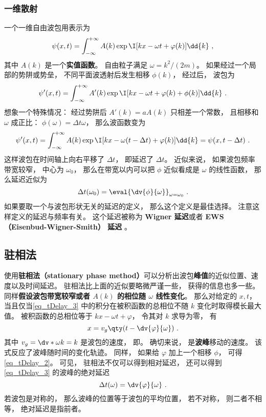 \subsubsection{一维散射}
一个一维自由波包用表示为
\begin{equation}\label{eq_tDelay_3}
\psi(x, t) = \int_{-\infty}^{+\infty} A(k) \exp \I[kx - \omega t + \varphi(k)] \dd{k}~,
\end{equation}
其中 $A(k)$ 是一个\textbf{实值函数}。 自由粒子满足 $\omega = k^2/(2m)$。 如果经过一个局部的势阱或势垒， 不同平面波透射后发生相移 $\phi(k)$， 经过后， 波包为
\begin{equation}\label{eq_tDelay_1}
\psi'(x, t) = \int_{-\infty}^{+\infty} A'(k) \exp \I[kx - \omega t + \varphi(k) + \phi(k)] \dd{k}~.
\end{equation}
想象一个特殊情况： 经过势阱后 $A'(k) = a A(k)$ 只相差一个常数， 且相移和 $\omega$ 成正比： $\phi(\omega) = \Delta t \omega$， 那么波函数变为
\begin{equation}
\psi'(x, t) = \int_{-\infty}^{+\infty} A(k) \exp \I[kx - \omega (t - \Delta t) + \varphi(k)] \dd{k}
= \psi(x, t - \Delta t)~.
\end{equation}
这样波包在时间轴上向右平移了 $\Delta t$， 即延迟了 $\Delta t$。 近似来说， 如果波包频率带宽较窄， 中心为 $\omega_0$， 那么在带宽以内可以把 $\phi$ 近似看成是 $\omega$ 的线性函数， 那么延迟近似为
\begin{equation}\label{eq_tDelay_2}
\Delta t(\omega_0) = \eval{\dv{\phi}{\omega}}_{\omega = \omega_0}~.
\end{equation}
如果要取一个与波包形状无关的延迟的定义， 那么这个定义是最佳选择。 注意这样定义的延迟与频率有关。 这个延迟被称为 \textbf{Wigner 延迟}或者 \textbf{EWS （Eisenbud-Wigner-Smith） 延迟} 。

\subsection{驻相法}
使用\textbf{驻相法（stationary phase method）}可以分析出波包\textbf{峰值}的近似位置、速度以及时间延迟。 驻相法比上面的近似要略微严谨一些， 获得的信息也多一些。 同样\textbf{假设波包带宽较窄或者 $A(k)$ 的相位随 $\omega$ 线性变化}。 那么对给定的 $x, t$， 当且仅当\autoref{eq_tDelay_3} 中的积分在被积函数的总相位不随 $k$ 变化时取得模长最大值。 被积函数的总相位等于 $kx - \omega t + \varphi$， 令其对 $k$ 求导为零， 有
\begin{equation}\label{eq_tDelay_5}
x = v_g \qty(t - \dv{\varphi}{\omega})~.
\end{equation}
其中 $v_g = \dv*{\omega}{k} = k$ 是波包的速度， 即。 确切来说， 是\textbf{波峰}移动的速度。 该式反应了波峰随时间的变化轨迹。 同样， 如果给 $\varphi$ 加上一个相移 $\phi$， 可得\autoref{eq_tDelay_2}。 可见， 驻相法不仅可以得到相对延迟， 还可以得到\autoref{eq_tDelay_3} 的波峰的绝对延迟
\begin{equation}\label{eq_tDelay_4}
\Delta t(\omega) = \dv{\varphi}{\omega}~.
\end{equation}
若波包是对称的， 那么波峰的位置等于波包的平均位置， 若不对称， 则二者不相等， 绝对延迟是指前者。


